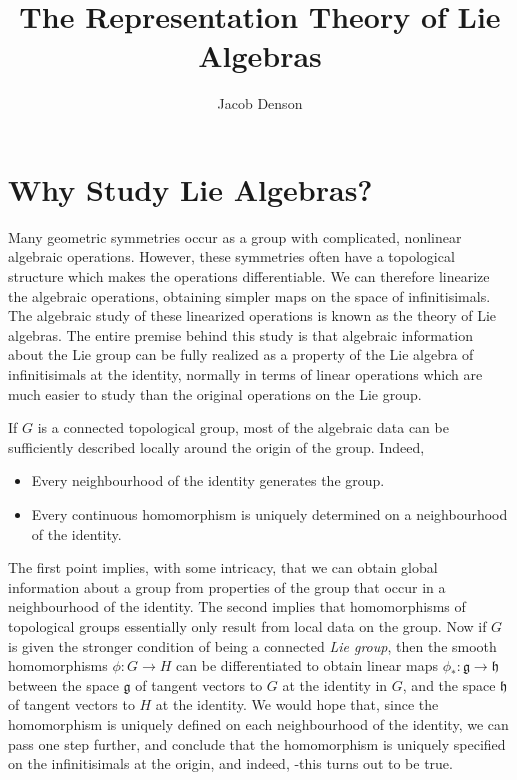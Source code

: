 

\title{The Representation Theory of Lie Algebras}
\author{Jacob Denson}




\maketitle

\tableofcontents


\chapter{Why Study Lie Algebras?}

Many geometric symmetries occur as a group with complicated, nonlinear algebraic operations. However, these symmetries often have a topological structure which makes the operations differentiable. We can therefore linearize the algebraic operations, obtaining simpler maps on the space of infinitisimals. The algebraic study of these linearized operations is known as the theory of Lie algebras. The entire premise behind this study is that algebraic information about the Lie group can be fully realized as a property of the Lie algebra of infinitisimals at the identity, normally in terms of linear operations which are much easier to study than the original operations on the Lie group.

If $G$ is a connected topological group, most of the algebraic data can be sufficiently described locally around the origin of the group. Indeed,
%
\begin{itemize}
    \item Every neighbourhood of the identity generates the group.
    \item Every continuous homomorphism is uniquely determined on a neighbourhood of the identity.
\end{itemize}
%
The first point implies, with some intricacy, that we can obtain global information about a group from properties of the group that occur in a neighbourhood of the identity. The second implies that homomorphisms of topological groups essentially only result from local data on the group. Now if $G$ is given the stronger condition of being a connected {\it Lie group}, then the smooth homomorphisms $\phi: G \to H$ can be differentiated to obtain linear maps $\phi_*: \mathfrak{g} \to \mathfrak{h}$ between the space $\mathfrak{g}$ of tangent vectors to $G$ at the identity in $G$, and the space $\mathfrak{h}$ of tangent vectors to $H$ at the identity. We would hope that, since the homomorphism is uniquely defined on each neighbourhood of the identity, we can pass one step further, and conclude that the homomorphism is uniquely specified on the infinitisimals at the origin, and indeed, -this turns out to be true.

